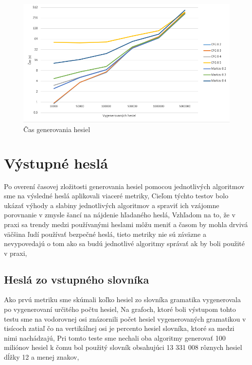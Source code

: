 \begin{figure}[ht]
    \centering
    \includegraphics[width=1\textwidth]{generateTime}
    \caption{Čas generovania hesiel}
    \label{fig:generateTime}
\end{figure}

\paragraph{}
\section{Výstupné heslá}
\label{sec:pass}
Po overení časovej zložitosti generovania hesiel pomocou jednotlivých algoritmov sme na výsledné heslá aplikovali viaceré metriky, Cieľom týchto testov bolo ukázať výhody a slabiny jednotlivých algoritmov a spraviť ich vzájomne porovnanie v zmysle šancí na nájdenie hľadaného heslá, Vzhľadom na to, že v praxi sa trendy medzi používanými heslami môžu meniť a časom by mohla drvivá väčšina ľudí používať bezpečné heslá, tieto metriky nie sú záväzne a nevypovedajú o tom ako sa budú jednotlivé algoritmy správať ak by boli použité v praxi,

\subsection{Heslá zo vstupného slovníka}
Ako prvú metriku sme skúmali koľko hesiel zo slovníka gramatika vygenerovala po vygenerovaní určitého počtu hesiel, Na grafoch, ktoré boli výstupom tohto testu sme na vodorovnej osi znázornili počet hesiel vygenerovaných gramatikou v tisícoch zatiaľ čo na vertikálnej osi je percento hesiel slovníka, ktoré sa medzi nimi nachádzajú, Pri tomto teste sme nechali oba algoritmy generovať 100 miliónov hesiel k čomu bol použitý slovník obsahujúci 13 331 008 rôznych hesiel dĺžky 12 a menej znakov,

